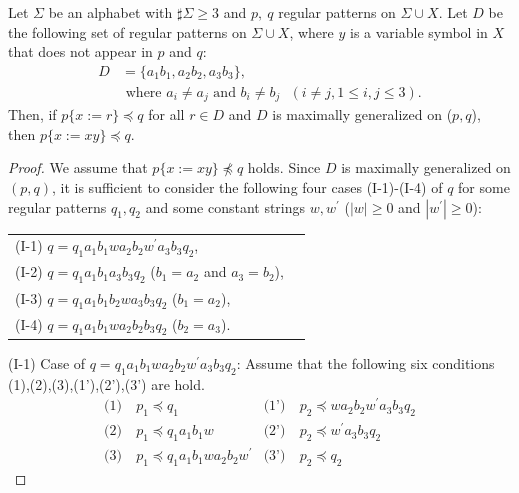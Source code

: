 \begin{lem}\label{lem:3consts_iii}
  Let $\Sigma$ be an alphabet with $\sharp\Sigma \ge 3$ and $p,~q$ regular patterns on $\Sigma\cup X$.
  Let $D$ be the following set of regular patterns on $\Sigma\cup X$, where $y$ is a variable symbol in $X$ that does not appear in $p$ and $q$:
  \begin{align*}
  D & = \{ a_{1}b_{1}, a_{2}b_{2}, a_{3}b_{3}\},\\
  & \mbox{ where } a_{i} \ne a_{j} \mbox{ and } b_{i} \ne b_{j} \mbox{ } (i\ne j, 1\le i,j\le 3).
  \end{align*}
  Then, if $p \{ x := r \} \preceq q$ for all $r \in D$ and $D$ is maximally generalized on ($p,q$), then $p \{ x := xy \} \preceq q$.
\end{lem}

\begin{proof}
We assume that $p \{ x := xy \} \not\preceq q$ holds.
Since $D$ is maximally generalized on $(p,q)$, it is sufficient to consider the following four cases (I-1)-(I-4) of $q$ for some regular patterns $q_{1},q_{2}$ and some constant strings $w,w^{\prime}$ ($|w|\geq 0$ and $|w^{\prime}|\geq 0$):

\smallskip
\noindent
\begin{tabular}{ll}
(I-1) $q=q_{1}a_{1}b_{1}wa_{2}b_{2}w^{\prime}a_{3}b_{3}q_{2}$,\\
(I-2) $q=q_{1}a_{1}b_{1}a_{3}b_{3}q_{2}$ ($b_{1}=a_{2}$ and $a_{3}=b_{2}$),\\
(I-3) $q=q_{1}a_{1}b_{1}b_{2}wa_{3}b_{3}q_{2}$ ($b_{1}=a_{2}$),\\
(I-4) $q=q_{1}a_{1}b_{1}wa_{2}b_{2}b_{3}q_{2}$ ($b_{2}=a_{3}$).
\end{tabular}
\smallskip

\noindent
(I-1) Case of $q=q_{1}a_{1}b_{1}wa_{2}b_{2}w^{\prime}a_{3}b_{3}q_{2}$:
Assume that the following six conditions (1),(2),(3),(1'),(2'),(3') are hold.
\begin{align*}
\textrm{(1)}~& p_{1} \preceq q_{1} & \textrm{(1')}~& p_{2} \preceq wa_{2}b_{2}w^{\prime}a_{3}b_{3}q_{2} \\
\textrm{(2)}~& p_{1} \preceq q_{1}a_{1}b_{1}w & \textrm{(2')}~& p_{2} \preceq w^{\prime}a_{3}b_{3}q_{2} \\
\textrm{(3)}~& p_{1} \preceq q_{1}a_{1}b_{1}wa_{2}b_{2}w^{\prime} & \textrm{(3')}~& p_{2} \preceq q_{2}
\end{align*}


\end{proof}
